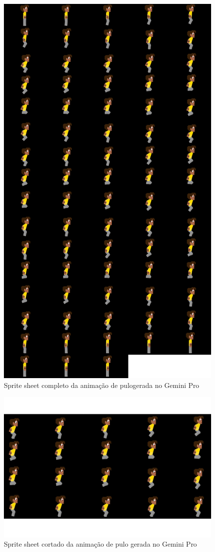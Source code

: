 \begin{figure}[htbp]
    \centering
    \caption{\small Sprite sheet completo da animação de pulogerada no Gemini Pro}
    \label{fig:geminiProPularSpriteSheet}
    \includegraphics[width=0.6\linewidth]{figs/geminiPro/sprite sheet/jump.png}
\end{figure}

\begin{figure}[htbp]
    \centering
    \caption{\small Sprite sheet cortado da animação de pulo gerada no Gemini Pro}
    \label{fig:geminiProPularSpriteSheetCortado}
    \includegraphics[width=0.8\linewidth]{figs/geminiPro/sprite sheet/jump_corte.png}
\end{figure}

